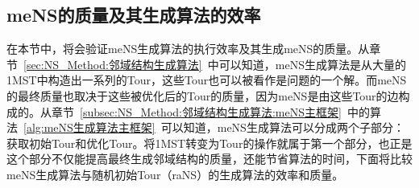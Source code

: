 \subsection{meNS的质量及其生成算法的效率}
\label{subsec:NS_Method:实验与讨论:meNS质量及其生成算法的效率}
在本节中，将会验证meNS生成算法的执行效率及其生成meNS的质量。从章节~\ref{sec:NS_Method:邻域结构生成算法}~中可以知道，meNS生成算法是从大量的1MST中构造出一系列的Tour，这些Tour也可以被看作是问题的一个解。而meNS的最终质量也取决于这些被优化后的Tour的质量，因为meNS是由这些Tour的边构成的。从章节~\ref{subsec:NS_Method:邻域结构生成算法:meNS主框架}~中的算法~\ref{alg:meNS生成算法主框架}~可以知道，meNS生成算法可以分成两个子部分：获取初始Tour和优化Tour。将1MST转变为Tour的操作就属于第一个部分，也正是这个部分不仅能提高最终生成邻域结构的质量，还能节省算法的时间，下面将比较meNS生成算法与随机初始Tour（raNS）的生成算法的效率和质量。
